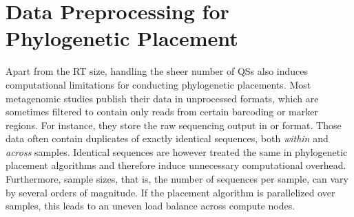 
\section{Data Preprocessing for Phylogenetic Placement}
\label{ch:AutomaticTrees:sec:DataPreprocessing}

Apart from the \ac{RT} size, handling the sheer number of \acp{QS}
also induces computational limitations for conducting phylogenetic placements.
Most metagenomic studies publish their data in unprocessed formats,
which are sometimes filtered to contain only reads from certain barcoding or marker regions.
For instance, they store the raw sequencing output in  \citep{Pearson1988} or  \citep{Cock2009} format.
Those data often contain duplicates of exactly identical sequences, both {\em within} and {\em across} samples.
Identical sequences are however treated the same in phylogenetic placement algorithms
and therefore induce unnecessary computational overhead.
Furthermore, sample sizes, that is, the number of sequences per sample, can vary by several orders of magnitude.
If the placement algorithm is parallelized over samples, this leads to an uneven load balance across compute nodes.

